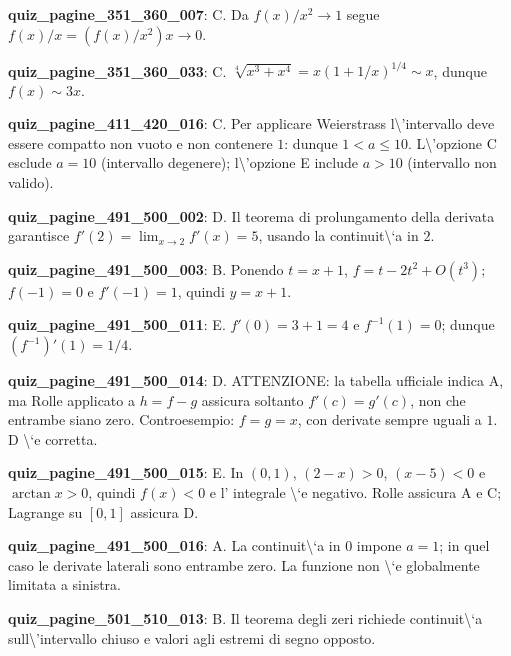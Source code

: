 \documentclass[11pt,a4paper]{article}
\newcounter{quiz}
\begin{document}
\noindent\textbf{quiz\_pagine\_351\_360\_007}: C. Da $f(x)/x^2\to1$ segue $f(x)/x=(f(x)/x^2)x\to0$.\par\medskip
\noindent\textbf{quiz\_pagine\_351\_360\_033}: C. $\sqrt[4]{x^3+x^4}=x(1+1/x)^{1/4}\sim x$, dunque $f(x)\sim3x$.\par\medskip
\noindent\textbf{quiz\_pagine\_411\_420\_016}: C. Per applicare Weierstrass l\textbackslash{}'intervallo deve essere compatto non vuoto e non contenere $1$: dunque $1<a\leq10$. L\textbackslash{}'opzione C esclude $a=10$ (intervallo degenere); l\textbackslash{}'opzione E include $a>10$ (intervallo non valido).\par\medskip
\noindent\textbf{quiz\_pagine\_491\_500\_002}: D. Il teorema di prolungamento della derivata garantisce $f\prime(2)=\lim_{x\to2}f\prime(x)=5$, usando la continuit\textbackslash{}`a in $2$.\par\medskip
\noindent\textbf{quiz\_pagine\_491\_500\_003}: B. Ponendo $t=x+1$, $f=t-2t^2+O(t^3)$; $f(-1)=0$ e $f\prime(-1)=1$, quindi $y=x+1$.\par\medskip
\noindent\textbf{quiz\_pagine\_491\_500\_011}: E. $f\prime(0)=3+1=4$ e $f^{-1}(1)=0$; dunque $(f^{-1})\prime(1)=1/4$.\par\medskip
\noindent\textbf{quiz\_pagine\_491\_500\_014}: D. ATTENZIONE: la tabella ufficiale indica A, ma Rolle applicato a $h=f-g$ assicura soltanto $f\prime(c)=g\prime(c)$, non che entrambe siano zero. Controesempio: $f=g=x$, con derivate sempre uguali a $1$. D \textbackslash{}`e corretta.\par\medskip
\noindent\textbf{quiz\_pagine\_491\_500\_015}: E. In $(0,1)$, $(2-x)>0$, $(x-5)<0$ e $\arctan x>0$, quindi $f(x)<0$ e l' integrale \textbackslash{}`e negativo. Rolle assicura A e C; Lagrange su $[0,1]$ assicura D.\par\medskip
\noindent\textbf{quiz\_pagine\_491\_500\_016}: A. La continuit\textbackslash{}`a in $0$ impone $a=1$; in quel caso le derivate laterali sono entrambe zero. La funzione non \textbackslash{}`e globalmente limitata a sinistra.\par\medskip
\noindent\textbf{quiz\_pagine\_501\_510\_013}: B. Il teorema degli zeri richiede continuit\textbackslash{}`a sull\textbackslash{}'intervallo chiuso e valori agli estremi di segno opposto.\par\medskip
\end{document}
